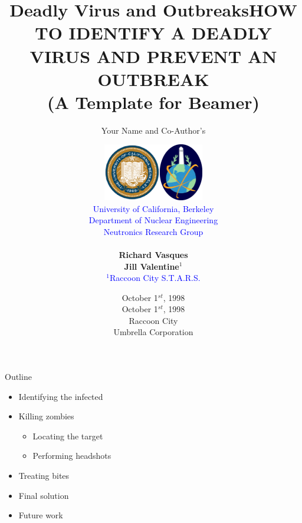 \documentclass[xcolor=x11names, compress]{beamer}
\title{Deadly Virus and Outbreaks}
\author{Your Name and Co-Author's}
\date{October 1$^{st}$, 1998}
\renewcommand{\(}{\begin{columns}}
\renewcommand{\)}{\end{columns}}
\newcommand{\<}[1]{\begin{column}{#1}}
\renewcommand{\>}{\end{column}}
\begin{document}
\begin{frame}[plain]
\title{HOW TO IDENTIFY A DEADLY VIRUS AND PREVENT AN OUTBREAK \\ (A Template for Beamer)}

\author{
\begin{tabular}{ccc}
\multirow{6}{65pt}{\includegraphics[height=2.5cm]{0bk.eps}}
& &
\multirow{6}{65pt}{\includegraphics[height=2.5cm]{0neutronics.png}} \\
&{\small\textcolor{blue}{University of California, Berkeley}} &\\
&{\small\textcolor{blue}{Department of Nuclear Engineering}}&\\
&{\small \textcolor{blue}{Neutronics Research Group}}&\\
& &\\
&\textbf{Richard Vasques}&\\
&\textbf{Jill Valentine$^{1}$}&\\
\multicolumn{3}{c}{\small\textcolor{blue}{$^{1}$Raccoon City S.T.A.R.S.}}
\end{tabular}}
\date{\vspace{-20pt}\\ October 1$^{st}$, 1998 \\ Raccoon City \\ Umbrella Corporation}
\titlepage
\end{frame}

\begin{frame}[fragile]{Outline}
	\begin{itemize}
	\item{Identifying the infected}
	\item{Killing zombies}
	\begin{itemize}
	    \item{Locating the target}
	    \item{Performing headshots}
	\end{itemize}
	\item{Treating bites}
	\item{Final solution}
	\item{Future work}
	\end{itemize}
\end{frame}
\end{document}
